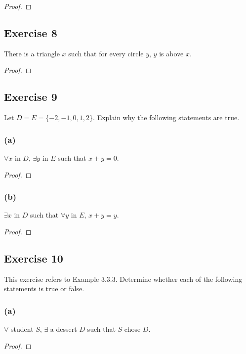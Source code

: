 \documentclass[14pt]{extarticle}
\newcommand{\fa}{\forall}
\newcommand{\te}{\exists}
\begin{document}
\begin{proof}

\end{proof}

\subsection{Exercise 8}
There is a triangle $x$ such that for every circle $y$, $y$ is above $x$.

\begin{proof}

\end{proof}

\subsection{Exercise 9}
Let $D = E = \{-2, -1, 0, 1, 2\}$. Explain why the following statements are true.

\subsubsection{(a)}
$\fa x$ in $D$, $\te y$ in $E$ such that $x + y = 0$.

\begin{proof}

\end{proof}

\subsubsection{(b)}
$\te x$ in $D$ such that $\fa y$ in $E$, $x + y = y$.

\begin{proof}

\end{proof}

\subsection{Exercise 10}
This exercise refers to Example 3.3.3. Determine whether each of the following statements is true or false.

\subsubsection{(a)}
$\fa$ student $S$, $\te$ a dessert $D$ such that $S$ chose $D$.

\begin{proof}

\end{proof}
\end{document}
